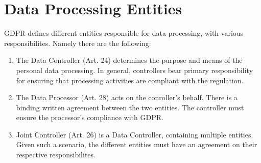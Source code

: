 \documentclass[a4paper,12pt]{report}
\begin{document}
	\section{Data Processing Entities}
	\startsection
	GDPR defines different entities responsible for data processing, with various responsibilites.
	Namely there are the following:
	\begin{enumerate}[]
		\item The Data Controller (Art. 24)
		determines the purpose and means of the personal data processing.
		In general, controllers bear primary responsibility for ensuring that processing activities are compliant with the regulation.
		\item The Data Processor (Art. 28)
		acts on the conroller's behalf. 
		There is a binding written agreement between the two entities. 
		The controller must ensure the processor's compliance with GDPR.
		\item Joint Controller (Art. 26) is a Data Controller, containing multiple entities.
		Given such a scenario, the different entities must have an agreement on their respective responsibilites.
	\end{enumerate}
	\closesection
\end{document}
